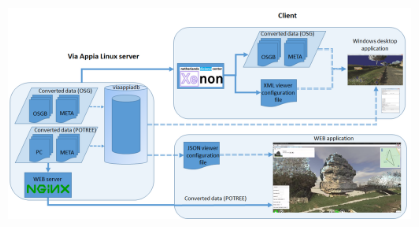 \begin{figure}[!ht]
 \centering
 \includegraphics[width=0.95\textwidth]{fig/system_architecture/TwoTierArchitecture.pdf}
 \caption{}
 \label{fig:sys_arch_2tier}
\end{figure}